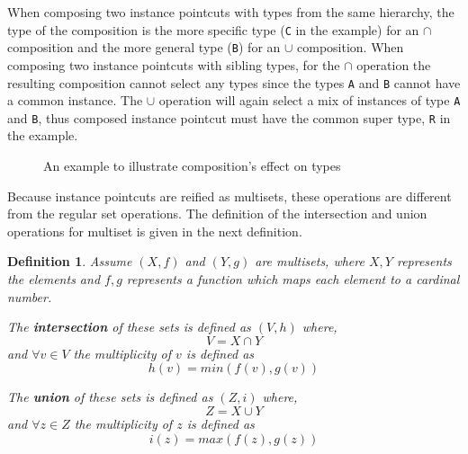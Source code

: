 \documentclass[10pt]{sigplanconf}
\newtheorem{mydef}{Definition}
\newcommand{\lstinln}[1]{\lstinline~#1~}
\begin{document}
When composing two instance pointcuts with types from the same hierarchy, the type of the composition is the more specific type (\lstinln{C} in the example) for an $\cap$ composition and the more general type (\lstinln{B}) for an $\cup$ composition.
When composing two instance pointcuts with sibling types, for the $\cap$ operation the resulting composition cannot select any types since the types \lstinln{A} and \lstinln{B} cannot have a common instance. The $\cup$ operation will again select a mix of instances of type \lstinln{A} and \lstinln{B}, thus composed instance pointcut must have the common super type, \lstinln{R} in the example.


\begin{figure}%
\centering
{}
\hspace{40pt}
\vspace{10pt}
\caption{An example to illustrate composition's effect on types}
\label{fig:compotypes}
\end{figure}

Because instance pointcuts are reified as multisets, these operations are different from the regular set operations. The definition of the intersection and union operations for multiset is given in the next definition.

\begin{mydef}
\label{def:inun}
Assume $(X, f)$ and $(Y, g)$ are multisets, where $X, Y$ represents the elements and $f, g$ represents a function which maps each element to a cardinal number.

The \textbf{intersection} of these sets is defined as $(V, h)$ where,
\[V = X \cap Y\] and
$\forall v \in V$ the multiplicity of $v$ is defined as \[h(v) =  min(f(v),g(v))\]

The \textbf{union} of these sets is defined as $(Z, i)$ where,
\[Z = X \cup Y\] and
$\forall z \in Z$ the multiplicity of $z$ is defined as \[i(z) =  max(f(z),g(z))\]
\end{mydef}
\end{document}

